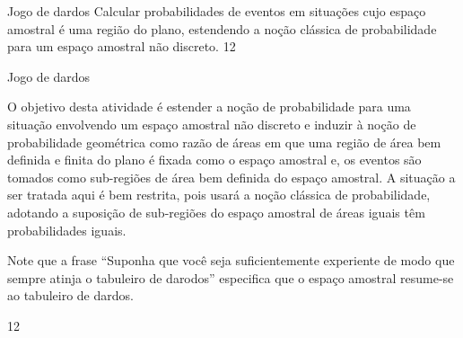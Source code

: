 \begin{objectives}{Jogo de dardos}
{
Calcular probabilidades de eventos em situações cujo espaço amostral é uma região do plano, estendendo a noção clássica de probabilidade para um espaço amostral não discreto.
}{1}{2}
\end{objectives}
\begin{sugestions}{Jogo de dardos}
{
O objetivo desta atividade é estender a noção de probabilidade para uma situação envolvendo um espaço amostral não discreto e induzir à noção de probabilidade geométrica como razão de áreas em que uma região de área bem definida e finita do plano é fixada como o espaço amostral e, os eventos são tomados como sub-regiões de área bem definida do espaço amostral. A situação a ser tratada aqui é bem restrita, pois usará a noção clássica de probabilidade, adotando a suposição de sub-regiões do espaço amostral de áreas iguais têm probabilidades iguais.

Note que a frase “Suponha que você seja suficientemente experiente de modo que sempre atinja o tabuleiro de darodos”{} especifica que o espaço amostral resume-se ao tabuleiro de dardos.
}{1}{2}
\end{sugestions}
\clearmargin
\marginpar{\vspace{.5em}}
